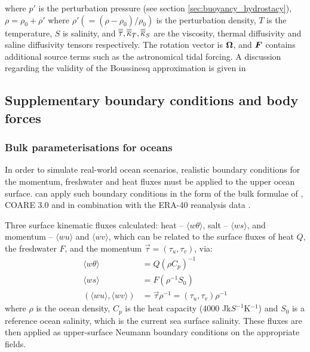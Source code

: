 where $p'$ is the perturbation pressure (see section \ref{sec:buoyancy_hydrostacy}),
$\rho=\rho_0+\rho'$ where $\rho'(=(\rho-\rho_0)/\rho_0)$ is the perturbation density,
$T$ is the temperature, $S$ is salinity, and
$\overline{\overline{\tau}},\overline{\overline{\kappa}}_T,\overline{\overline{\kappa}}_S$ are the viscosity, thermal diffusivity and saline
diffusivity tensors respectively.
The rotation vector is ${\mbox{\boldmath$\Omega$}}$, and ${\mbox{\boldmath$F$}}$ contains additional source terms such as the astronomical tidal forcing. A discussion
regarding the validity of the Boussinesq approximation is given in \cite{Gray1976}

\subsection{Supplementary boundary conditions and body forces}

\subsubsection{Bulk parameterisations for oceans}

In order to simulate real-world ocean scenarios, realistic boundary conditions for the momentum, freshwater and heat fluxes 
must be applied to the upper ocean surface. \fluidity can apply such boundary conditions in the form of the bulk formulae of \citet{large2004},
COARE 3.0 \citep{fairall2003} and \citet{kara2005} in combination with the ERA-40 reanalysis data \citep{Uppala2005}.

Three surface kinematic fluxes calculated: heat -- $\langle w\theta \rangle$,
salt -- $\langle ws \rangle$, and momentum -- $\langle wu \rangle$ and $\langle wv \rangle$,
which can be related to the surface fluxes of heat $Q$, the
freshwater $F$, and the momentum $\overrightarrow\tau=\left(\tau_u,\tau_v\right)$, via:
\begin{align}
\langle w\theta \rangle &= Q\left(\rho C_p \right)^{-1} \\
\langle ws \rangle &= F\left(\rho^{-1}S_0\right) \\
\left(\langle wu \rangle, \langle wv \rangle\right) &=
\overrightarrow{\tau}\rho^{-1} =
\left(\tau_u,\tau_v\right)\rho^{-1}
\end{align}
where $\rho$ is the ocean density, $C_p$ is the heat capacity (4000 Jk$S^{-1}$K$^{-1}$) 
and $S_0$ is a reference ocean salinity, which is the current sea surface salinity. 
These fluxes are then applied as upper-surface Neumann boundary conditions on
the appropriate fields.

